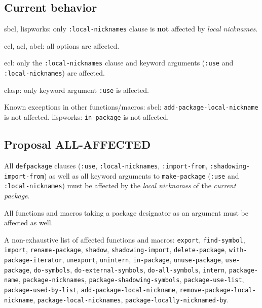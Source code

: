 \documentclass[11pt]{article}
\begin{document}
\subsection{Current behavior}
\label{sec:org6811770}
sbcl, lispworks:
  only \texttt{:local-nicknames} clause is \textbf{not} affected by \emph{local nicknames}.

ccl, acl, abcl:
  all options are affected.

ecl:
  only the \texttt{:local-nicknames} clause and keyword arguments (\texttt{:use} and
  \texttt{:local-nicknames}) are affected.

clasp:
  only keyword argument \texttt{:use} is affected.

Known exceptions in other functions/macros:
sbcl: \texttt{add-package-local-nickname} is not affected.
lispworks: \texttt{in-package} is not affected.
\subsection{Proposal ALL-AFFECTED}
\label{sec:orgaa15b29}
All \texttt{defpackage} clauses (\texttt{:use}, \texttt{:local-nicknames}, \texttt{:import-from},
\texttt{:shadowing-import-from}) as well as all keyword arguments to \texttt{make-package}
(\texttt{:use} and \texttt{:local-nicknames}) must be affected by the \emph{local nicknames} of the
\emph{current package}.

All functions and macros taking a package designator as an argument must be
affected as well.

A non-exhaustive list of affected functions and macros:
  \texttt{export}, \texttt{find-symbol}, \texttt{import}, \texttt{rename-package}, \texttt{shadow},
  \texttt{shadowing-import}, \texttt{delete-package}, \texttt{with-package-iterator}, \texttt{unexport},
  \texttt{unintern}, \texttt{in-package}, \texttt{unuse-package}, \texttt{use-package}, \texttt{do-symbols},
  \texttt{do-external-symbols}, \texttt{do-all-symbols}, \texttt{intern}, \texttt{package-name},
  \texttt{package-nicknames}, \texttt{package-shadowing-symbols}, \texttt{package-use-list},
  \texttt{package-used-by-list}, \texttt{add-package-local-nickname},
  \texttt{remove-package-local-nickname}, \texttt{package-local-nicknames},
  \texttt{package-locally-nicknamed-by}.
\end{document}
